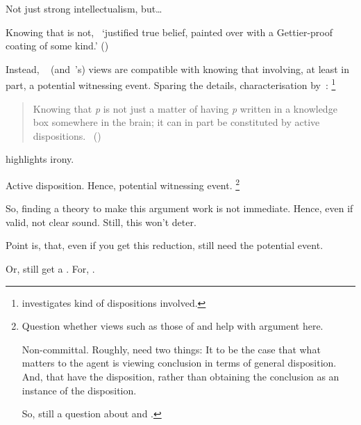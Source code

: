 \begin{note}
  Not just strong intellectualism, but\dots

  Knowing that is not,~\cite{Stalnaker:2012tp} `justiﬁed true belief, painted over with a Gettier-proof coating of some kind.' (\citeyear[754]{Stalnaker:2012tp})

  Instead, ~\citeauthor{Stanley:2011ut} (and~\citeauthor{Stalnaker:2012tp}'s) views are compatible with knowing that involving, at least in part, a potential witnessing event.
  Sparing the details, characterisation by~\citeauthor{Weatherson:2017tb}:%
  \footnote{
    \textcite{Weatherson:2017tb} investigates kind of dispositions involved.
  }

  \nocite{Stanley:2012wg}
  \begin{quote}
    Knowing that \emph{p} is not just a matter of having \emph{p} written in a knowledge box somewhere in the brain; it can in part be constituted by active dispositions.%
    \mbox{ }\hfill\mbox{(\citeyear[8]{Weatherson:2017tb})}
  \end{quote}

  \citeauthor{Stalnaker:2012tp} highlights irony.

  Active disposition.
  Hence, potential witnessing event.%
  \footnote{
    Question whether views such as those of \cite{Stalnaker:2012tp} and \citeauthor{Stanley:2011ut} help with argument here.

    Non-committal.
    Roughly, need two things:
    It to be the case that what matters to the agent is viewing conclusion in terms of general disposition.
    And, that have the disposition, rather than obtaining the conclusion as an instance of the disposition.

    So, still a question about \qzS{} and \qWhy{}.
  }
\end{note}

\begin{note}
  So, finding a theory to make this argument work is not immediate.
  Hence, even if valid, not clear sound.
  Still, this won't deter.
\end{note}

\begin{note}
  Point is, that, even if you get this reduction, still need the potential event.
\end{note}

\begin{note}
  Or, still get a \requ{}.
  For, \deadEnd{}.
\end{note}


